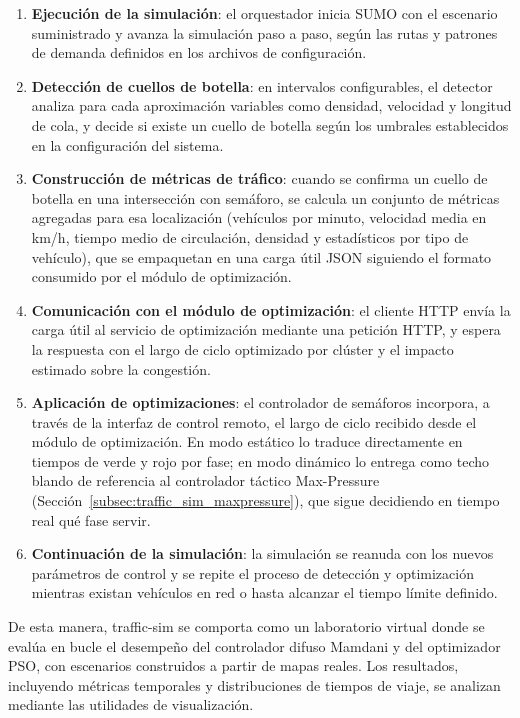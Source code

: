 \begin{enumerate}
    \item \textbf{Ejecución de la simulación}: el orquestador inicia SUMO con el escenario suministrado y avanza la simulación paso a paso, según las rutas y patrones de demanda definidos en los archivos de configuración.
    \item \textbf{Detección de cuellos de botella}: en intervalos configurables, el detector analiza para cada aproximación variables como densidad, velocidad y longitud de cola, y decide si existe un cuello de botella según los umbrales establecidos en la configuración del sistema.
    \item \textbf{Construcción de métricas de tráfico}: cuando se confirma un cuello de botella en una intersección con semáforo, se calcula un conjunto de métricas agregadas para esa localización (vehículos por minuto, velocidad media en km/h, tiempo medio de circulación, densidad y estadísticos por tipo de vehículo), que se empaquetan en una carga útil JSON siguiendo el formato consumido por el módulo de optimización.
    \item \textbf{Comunicación con el módulo de optimización}: el cliente HTTP envía la carga útil al servicio de optimización mediante una petición HTTP, y espera la respuesta con el largo de ciclo optimizado por clúster y el impacto estimado sobre la congestión.
    \item \textbf{Aplicación de optimizaciones}: el controlador de semáforos incorpora, a través de la interfaz de control remoto, el largo de ciclo recibido desde el módulo de optimización. En modo estático lo traduce directamente en tiempos de verde y rojo por fase; en modo dinámico lo entrega como techo blando de referencia al controlador táctico Max-Pressure (Sección~\ref{subsec:traffic_sim_maxpressure}), que sigue decidiendo en tiempo real qué fase servir.
    \item \textbf{Continuación de la simulación}: la simulación se reanuda con los nuevos parámetros de control y se repite el proceso de detección y optimización mientras existan vehículos en red o hasta alcanzar el tiempo límite definido.
\end{enumerate}

De esta manera, traffic-sim se comporta como un laboratorio virtual donde se evalúa en bucle el desempeño del controlador difuso Mamdani y del optimizador PSO, con escenarios construidos a partir de mapas reales. Los resultados, incluyendo métricas temporales y distribuciones de tiempos de viaje, se analizan mediante las utilidades de visualización.

